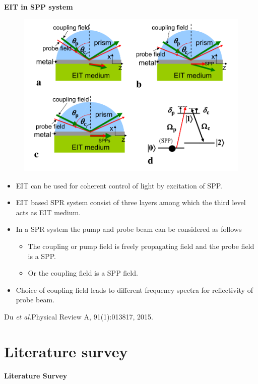 \documentclass[9pt,aspectratio94]{beamer}
\begin{document}
\begin{frame}{\textbf{EIT in SPP system}}
 \begin{figure}
     \centering
     \includegraphics[scale=0.7]{spp_angle_diagram.png}
\end{figure}
\begin{itemize}
 \item EIT can be used for coherent control of light by excitation of SPP.
     \item EIT based SPR system consist of three layers among which the third level acts as EIT medium.
     \item In a SPR system the pump and probe beam can be considered as follows
     \begin{itemize}
         \item The coupling or pump field is freely propagating field and the probe field is a SPP. 
         \item Or the coupling field is a SPP field.
     \end{itemize}
     \item Choice of coupling field leads to different frequency spectra for reflectivity of probe beam.
 \end{itemize} 
 \tiny{Du \textit{et al.}Physical Review A, 91(1):013817, 2015.}
\end{frame}
\section{\textbf{Literature survey}}
\begin{frame}
\begin{center}
    \begin{tcolorbox}[arc=3mm, width= 10cm, colback=blue!10!white, halign= center,]
             \textbf{Literature Survey }
         \end{tcolorbox}
\end{center}
\end{frame}
\end{document}
